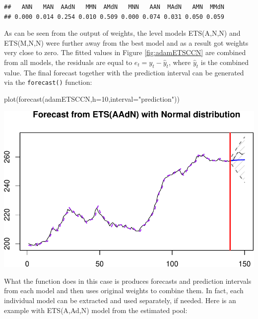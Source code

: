 \documentclass[
]{book}
\newenvironment{Shaded}{\begin{snugshade}}{\end{snugshade}}
\newcommand{\AttributeTok}[1]{\textcolor[rgb]{0.77,0.63,0.00}{#1}}
\newcommand{\DecValTok}[1]{\textcolor[rgb]{0.00,0.00,0.81}{#1}}
\newcommand{\FunctionTok}[1]{\textcolor[rgb]{0.00,0.00,0.00}{#1}}
\newcommand{\NormalTok}[1]{#1}
\newcommand{\SpecialCharTok}[1]{\textcolor[rgb]{0.00,0.00,0.00}{#1}}
\newcommand{\StringTok}[1]{\textcolor[rgb]{0.31,0.60,0.02}{#1}}
\theoremstyle{definition}
\theoremstyle{definition}
\theoremstyle{definition}
\theoremstyle{definition}
\theoremstyle{remark}
\begin{document}
\begin{Shaded}
\end{Shaded}

\begin{verbatim}
##   ANN   MAN  AAdN   MMN  AMdN   MNN   AAN  MAdN   AMN  MMdN 
## 0.000 0.014 0.254 0.010 0.509 0.000 0.074 0.031 0.050 0.059
\end{verbatim}

As can be seen from the output of weights, the level models ETS(A,N,N) and ETS(M,N,N) were further away from the best model and as a result got weights very close to zero. The fitted values in Figure \ref{fig:adamETSCCN} are combined from all models, the residuals are equal to \(e_t = y_t - \hat{y}_t\), where \(\hat{y}_t\) is the combined value. The final forecast together with the prediction interval can be generated via the \texttt{forecast()} function:

\begin{Shaded}
\begin{Highlighting}[]
\FunctionTok{plot}\NormalTok{(}\FunctionTok{forecast}\NormalTok{(adamETSCCN,}\AttributeTok{h=}\DecValTok{10}\NormalTok{,}\AttributeTok{interval=}\StringTok{"prediction"}\NormalTok{))}
\end{Highlighting}
\end{Shaded}

\includegraphics{adam_files/figure-latex/unnamed-chunk-182-1.pdf}

What the function does in this case is produces forecasts and prediction intervals from each model and then uses original weights to combine them. In fact, each individual model can be extracted and used separately, if needed. Here is an example with ETS(A,Ad,N) model from the estimated pool:
\end{document}
